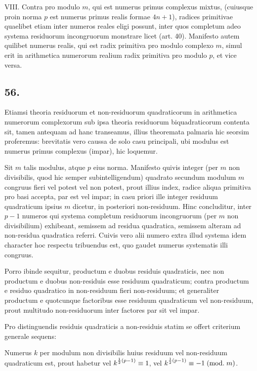 \documentclass[twoside,12pt]{memoir}
\renewcommand{\pmod}[1]{\;(\textrm{mod.}\;#1)}
\let\oldfrac\frac
\def\frac#1#2{\mathchoice{\tfrac{#1}{#2}}{\oldfrac{#1}{#2}}{\genfrac{}{}{}{2}{#1}{#2\mathstrut}}{\genfrac{}{}{}{3}{#1}{#2\mathstrut}}}
\begin{document}
VIII. Contra pro modulo \(m\), qui est numerus primus complexus mixtus, (cuiusque proin norma \(p\) est numerus primus realis formae \(4 n+1\)), radices primitivae quaelibet etiam inter numeros reales eligi possunt, inter quos completum adeo systema residuorum incongruorum monstrare licet (art. 40). Manifesto autem quilibet numerus realis, qui est radix primitiva pro modulo complexo \(m\), simul erit in arithmetica numerorum realium radix primitiva pro modulo \(p\), et vice versa.

\subsection*{56.}
 
Etiamsi theoria residuorum et non-residuorum quadraticorum in arithmetica numerorum complexorum sub ipsa theoria residuorum biquadraticorum contenta sit, tamen antequam ad hanc transeamus, illius theoremata palmaria hic seorsim proferemus: brevitatis vero caussa de solo casu principali, ubi modulus est numerus primus complexus (impar), hic loquemur.

Sit \(m\) talis modulus, atque \(p\) eius norma. Manifesto quivis integer (per \(m\) non divisibilis, quod hic semper subintelligendum) quadrato secundum modulum \(m\) congruus fieri vel potest vel non potest, prout illius index, radice aliqua primitiva pro basi accepta, par est vel impar; in casu priori ille integer residuum quadraticum ipsius \(m\) dicetur, in posteriori non-residuum. Hinc concluditur, inter \(p-1\) numeros qui systema completum residuorum incongruorum (per \(m\) non divisibilium) exhibeant, semissem ad residua quadratica, semissem alteram ad non-residua quadratica referri. Cuivis vero alii numero extra illud systema idem\pagebreak%
character hoc respectu tribuendus est, quo gaudet numerus systematis illi congruus.
 
Porro ibinde sequitur, productum e duobus residuis quadraticis, nec non productum e duobus non-residuis esse residuum quadraticum; contra productum e residuo quadratico in non-residuum fieri non-residuum; et generaliter productum e quotcunque factoribus esse residuum quadraticum vel non-residuum, prout multitudo non-residuorum inter factores par sit vel impar.

Pro distinguendis residuis quadraticis a non-residuis statim se offert criterium generale sequens:
 
Numerus \(k\) per modulum non divisibilis huius residuum vel non-residuum quadraticum est, prout habetur vel \(k^{\frac{1}{2}(p-1)} \equiv 1\), vel \(k^{\frac{1}{2}(p-1)} \equiv-1\pmod{m}\).
 
\end{document}
